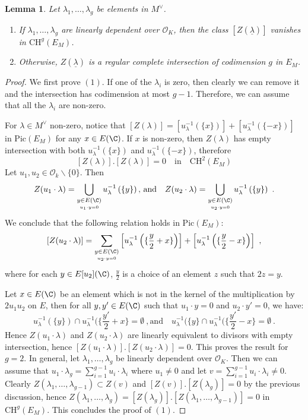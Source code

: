\documentclass[11pt,letterpaper,english]{amsart}
\numberwithin{equation}{subsection}
\numberwithin{equation}{section}
\newcommand\cO{{\mathcal O}}
\theoremstyle{plain}
\newtheorem{lemma}[theorem]{Lemma}
\theoremstyle{remark}
\begin{document}
\begin{lemma}
    Let $\lambda_1,\ldots,\lambda_g$ be elements in $M^\vee$. 
    \begin{enumerate}
        \item If $\lambda_1,\ldots,\lambda_g$ are linearly dependent over $\cO_K$, then the class $[Z(\underline{\lambda})]$ vanishes in $\mathrm{CH}^g(E_M)$.
     \item Otherwise, $Z(\underline{\lambda})$ is a regular complete intersection of codimension $g$ in $E_M$.
    \end{enumerate}
    
\end{lemma}
\begin{proof}
We first prove $(1)$. If one of the $\lambda_i$ is zero, then clearly we can remove it and the intersection has codimension at most $g-1$. Therefore, we can assume that all the $\lambda_i$ are non-zero. 

For $\lambda\in M^{\vee}$ non-zero, notice that $[Z(\lambda)]=[u_\lambda^{-1}(\{x\})]+[u_\lambda^{-1}(\{-x\})]$ in $\mathrm{Pic}(E_M)$ for any $x\in E(\C)$. If $x$ is non-zero, then $Z(\lambda)$ has empty intersection with both $u_\lambda^{-1}(\{x\})$ and $u_\lambda^{-1}(\{-x\})$, therefore \[[Z(\lambda)].[Z(\lambda)]=0 \quad \textrm{in}\quad \mathrm{CH}^2(E_M)\] 
Let $u_1,u_2\in\mathcal{O}_k\backslash\{0\}$. Then \[Z(u_1\cdot \lambda)=\bigcup_{\underset{u_1\cdot y=0}{y\in E(\C)}}u_\lambda^{-1}\left(\{y\}\right),\, \textrm{and}\quad  Z(u_2\cdot\lambda)=\bigcup_{\underset{u_2\cdot y=0}{y\in E(\C)}}u_\lambda^{-1}\left(\{y\}\right)~.\] 
We conclude that the following relation holds in $\mathrm{Pic}(E_M)$: 
\[[Z(u_2\cdot \lambda)]=\sum_{\underset{u_2\cdot y=0}{y\in E(\C)}}\left[u_\lambda^{-1}\left(\{\frac{y}{2}+x\}\right)\right]+\left[u_\lambda^{-1}\left(\{\frac{y}{2}-x\}\right)\right]~,\]
where for each $y\in E[u_2](\C)$, $\frac{y}{2}$ is a choice of an element $z$ such that $2z=y$.

Let $x\in E(\C)$ be an element which is not in the kernel of the multiplication by $2u_1u_2$ on $E$, then for all $y,y'\in E(\C)$ such that $u_1\cdot y=0$ and $u_2\cdot y'=0$, we have: \[u_\lambda^{-1}\left(\{y\}\right)\cap u_\lambda^{-1}(\{\frac{y'}{2}+x\}=\emptyset~,\textrm{and}\quad u_\lambda^{-1}(\{y\}\cap u_\lambda^{-1}(\{\frac{y'}{2}-x\}=\emptyset~.\]   Hence $Z(u_1\cdot\lambda)$ and $Z(u_2\cdot\lambda)$ are linearly equivalent to divisors with empty intersection, hence $[Z(u_1\cdot\lambda)].[Z(u_2\cdot\lambda)]=0$. This proves the result for $g=2$. In general, let $\lambda_1,\ldots,\lambda_g$ be linearly dependent over $\cO_K$. Then we can assume that $u_1\cdot\lambda_g=\sum_{i=1}^{g-1}u_i\cdot\lambda_i$ where $u_1\neq 0$ and let $v=\sum_{i=1}^{g-1}u_i\cdot\lambda_i\neq 0$. Clearly $Z(\lambda_1,\ldots,\lambda_{g-1})\subset Z(v)$ and $[Z(v)].[Z(\lambda_g)]=0$ by the previous discussion, hence $Z(\lambda_1,\ldots,\lambda_g)=[Z(\lambda_g)].[Z(\lambda_1,\ldots,\lambda_{g-1})]=0$ in $\mathrm{CH}^{g}(E_M)$. This concludes the proof of $(1)$.


\end{proof}
\end{document}
